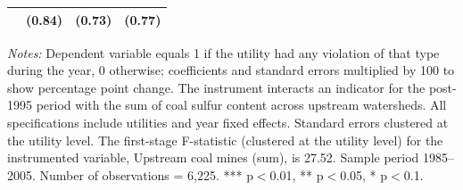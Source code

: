 \begin{table}[htbp]
{\begin{tabular}{p{5.5cm}>{\raggedleft\arraybackslash}p{3cm}>{\raggedleft\arraybackslash}p{3cm}>{\raggedleft\arraybackslash}p{3cm}}
 & (\phantom{-}0.84)\phantom{$^{***}$} & (\phantom{-}0.73)\phantom{$^{***}$} & (\phantom{-}0.77)\phantom{$^{***}$} \\
\bottomrule
\end{tabular}
}
\begin{minipage}{15.6247cm}
\vspace{4pt}
\footnotesize
\raggedright
\textit{Notes:} Dependent variable equals 1 if the utility had any violation of that type during the year, 0 otherwise; coefficients and standard errors multiplied by 100 to show percentage point change. The instrument interacts an indicator for the post-1995 period with the sum of coal sulfur content across upstream watersheds. All specifications include utilities and year fixed effects. Standard errors clustered at the utility level. The first-stage F-statistic (clustered at the utility level) for the instrumented variable, Upstream coal mines (sum), is 27.52. Sample period 1985--2005. Number of observations = 6,225. *** p$<$0.01, ** p$<$0.05, * p$<$0.1.
\end{minipage}
\end{table}
